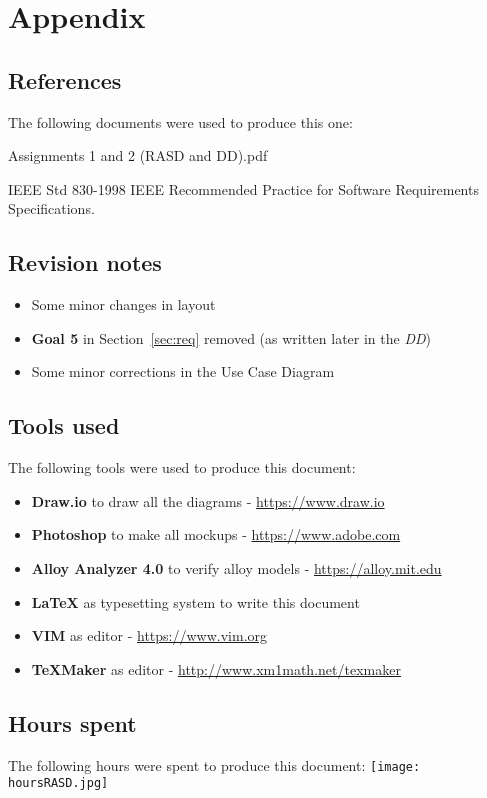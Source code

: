 \pagebreak
\section{Appendix}

\subsection*{References}
The following documents were used to produce this one:
\begingroup
    \renewcommand{\section}[2]{}%
    \begin{thebibliography}{9}
        Assignments 1 and 2 (RASD and DD).pdf

        IEEE Std 830-1998 IEEE Recommended Practice for Software Requirements
        Specifications.
    \end{thebibliography}
\endgroup

\subsection*{Revision notes}
\begin{itemize}
    \item Some minor changes in layout
    \item \textbf{Goal 5} in Section~\ref{sec:req} removed (as written later in the \emph{DD})
    \item Some minor corrections in the Use Case Diagram
\end{itemize}

\subsection*{Tools used}
The following tools were used to produce this document:
\begin{itemize}
    \item \textbf{Draw.io} to draw all the diagrams - \url{https://www.draw.io}
    \item \textbf{Photoshop} to make all mockups - \url{https://www.adobe.com}
    \item \textbf{Alloy Analyzer 4.0} to verify alloy models - \url{https://alloy.mit.edu}
    \item \textbf{LaTeX} as typesetting system to write this document
    \item \textbf{VIM} as editor - \url{https://www.vim.org}
    \item \textbf{TeXMaker} as editor - \url{http://www.xm1math.net/texmaker}
\end{itemize}

\subsection*{Hours spent}
The following hours were spent to produce this document:
\vfill
\texttt{[image: hoursRASD.jpg]}
